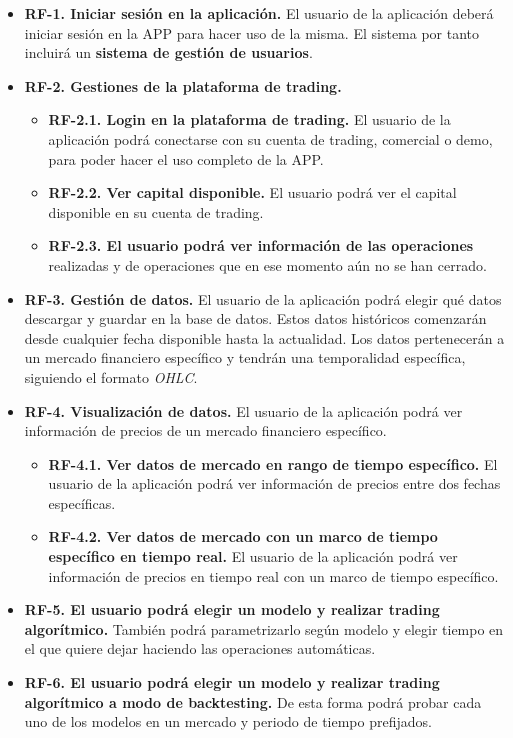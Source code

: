 \begin{itemize}
	
	\item \textbf{RF-1. Iniciar sesión en la aplicación.} El usuario de la aplicación deberá iniciar sesión en la APP para hacer uso de la misma. El sistema por tanto incluirá un \textbf{sistema de gestión de usuarios}.
	
	\item \textbf{RF-2. Gestiones de la plataforma de trading.} 
	\begin{itemize}
		\item \textbf{RF-2.1. Login en la plataforma de trading.} El usuario de la aplicación podrá conectarse con su cuenta de trading, comercial o demo, para poder hacer el uso completo de la APP.
		\item \textbf{RF-2.2. Ver capital disponible.} El usuario podrá ver el capital disponible en su cuenta de trading.
		\item \textbf{RF-2.3. El usuario podrá ver información de las operaciones} realizadas y de operaciones que en ese momento aún no se han cerrado.
	\end{itemize}

	\item \textbf{RF-3. Gestión de datos.} El usuario de la aplicación podrá elegir qué datos descargar y guardar en la base de datos. Estos datos históricos comenzarán desde cualquier fecha disponible hasta la actualidad. Los datos pertenecerán a un mercado financiero específico y tendrán una temporalidad específica, siguiendo el formato \textit{OHLC}.

	\item \textbf{RF-4. Visualización de datos.} El usuario de la aplicación podrá ver información de precios de un mercado financiero específico.
	\begin{itemize}
		\item \textbf{RF-4.1. Ver datos de mercado en rango de tiempo específico.} El usuario de la aplicación podrá ver información de precios entre dos fechas específicas.
		\item \textbf{RF-4.2. Ver datos de mercado con un marco de tiempo específico en tiempo real.} El usuario de la aplicación podrá ver información de precios en tiempo real con un marco de tiempo específico.
	\end{itemize}

	\item \textbf{RF-5. El usuario podrá elegir un modelo y realizar trading algorítmico.} También podrá parametrizarlo según modelo y elegir tiempo en el que quiere dejar haciendo las operaciones automáticas. 

	\item \textbf{RF-6. El usuario podrá elegir un modelo y realizar trading algorítmico a modo de backtesting.} De esta forma podrá probar cada uno de los modelos en un mercado y periodo de tiempo prefijados.
	
\end{itemize}

